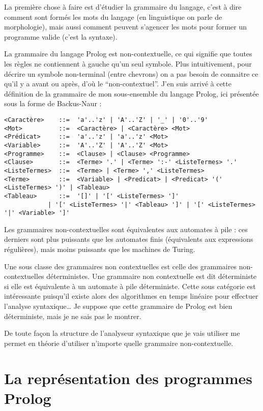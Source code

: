 \documentclass{article}
\begin{document}
La première chose à faire est d'étudier la grammaire du langage, c'est à dire comment sont formés les mots du langage (en linguistique on parle de morphologie), mais aussi comment peuvent s'agencer les mots pour former un programme valide (c'est la syntaxe).

La grammaire du langage Prolog est non-contextuelle, ce qui signifie que toutes les règles ne contiennent à gauche qu'un seul symbole. Plus intuitivement, pour décrire un symbole non-terminal (entre chevrons) on a pas besoin de connaitre ce qu'il y a avant ou après, d'où le ``non-contextuel''. J'en suis arrivé à cette définition de la grammaire de mon sous-ensemble du langage Prolog, ici présentée sous la forme de Backus-Naur :

\begin{verbatim}
<Caractère>    ::=  'a'..'z' | 'A'..'Z' | '_' | '0'..'9'
<Mot>          ::=  <Caractère> | <Caractère> <Mot>
<Prédicat>     ::=  'a'..'z' | 'a'..'z' <Mot>
<Variable>     ::=  'A'..'Z' | 'A'..'Z' <Mot>
<Programme>    ::=  <Clause> | <Clause> <Programme>
<Clause>       ::=  <Terme> '.' | <Terme> ':-' <ListeTermes> '.'
<ListeTermes>  ::=  <Terme> | <Terme> ',' <ListeTermes>
<Terme>        ::=  <Variable> | <Predicat> | <Predicat> '(' <ListeTermes> ')' | <Tableau>
<Tableau>      ::=  '[]' | '[' <ListeTermes> ']'
            | '[' <ListeTermes> '|' <Tableau> ']' | '[' <ListeTermes> '|' <Variable> ']'
\end{verbatim}

Les grammaires non-contextuelles sont équivalentes aux automates à pile : ces derniers sont plus puissants que les automates finis (équivalents aux expressions régulières), mais moins puissants que les machines de Turing.

Une sous classe des grammaires non contextuelles est celle des grammaires non-contextuelles déterministes. Une grammaire non contextuelle est dit déterministe si elle est équivalente à un automate à pile déterministe. Cette sous catégorie est intéressante puisqu'il existe alors des algorithmes en temps linéaire pour effectuer l'analyse syntaxique\ldots{} Je suppose que cette grammaire de Prolog est bien déterministe, mais je ne sais pas le montrer.

De toute façon la structure de l'analyseur syntaxique que je vais utiliser me permet en théorie d'utiliser n'importe quelle grammaire non-contextuelle.

\section{La représentation des programmes Prolog}
\end{document}
